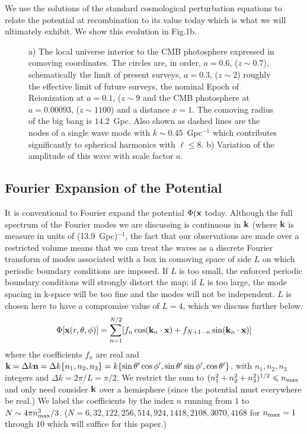 \documentclass[useAMS,usenatbib,a4paper]{mn2e}
\begin{document}
We use the solutions of the standard cosmological perturbation equations to relate the potential at recombination to its value today which is what we will ultimately exhibit. We show this evolution in Fig.1b.
\begin{figure}[t]
\centering
\caption{\small{a) The local universe interior to the CMB photosphere expressed in comoving coordinates. The circles are, in order, $a=0.6$, ($z\sim0.7$), schematically the limit of present surveys, $a=0.3$, ($z\sim2$) roughly the effective limit of future surveys, the nominal Epoch of Reionization at $a=0.1$, ($z\sim9$ and the CMB photosphere at $a=0.00093$, ($z\sim1100$) and a distance $x=1$. The comoving radius of the big bang is $14.2$~Gpc. Also shown as dashed lines are the nodes of a single wave mode with $k\sim0.45$~Gpc$^{-1}$ which contributes significantly to spherical harmonics with $\ell\leq8$. b) Variation of the amplitude of this wave with scale factor $a$.}}
\end{figure}
\subsection{Fourier Expansion of the Potential}
It is conventional to Fourier expand the potential $\Phi({\bf x}$ today. Although the full spectrum of the Fourier modes we are discussing is continuous in ${\bf k}$ (where $\bf k$ is measure in units of (13.9~Gpc)$^{-1}$, the fact that our observations are made over a restricted volume means that we can treat the waves as a discrete Fourier transform of modes associated with a box in comoving space of side $L$ on which periodic boundary conditions are imposed. If $L$ is too small, the enforced periodic boundary conditions will strongly distort the map; if $L$ is too large, the mode spacing in k-space will be too fine and the modes will not be independent. $L$ is chosen here to have a compromise value of $L=4$, which we discuss further below.
\begin{equation}
\Phi[{\bf x}(r,\theta,\phi)]=\sum_{n=1}^{N/2}[f_n\cos({\bf k}_n\cdot{\bf x})+f_{N+1-n}\sin({\bf k}_n\cdot{\bf x})]
\end{equation}
where the coefficients $f_n$ are real and ${\bf k}=\Delta k{\bf n}=\Delta k\{n_1,n_2,n_3\}=k\{\sin\theta'\cos\phi',\sin\theta'\sin\phi',\cos\theta'\}$, with $n_1,n_2,n_3$ integers and $\Delta k=2\pi/L=\pi/2$.  We restrict the sum to $(n_1^2+n_2^2+n_3^2)^{1/2}\le n_{\rm max}$ and only need consider $\bf k$ over a hemisphere (since the potential must everywhere be real.) We label the coefficients by the index $n$ running from $1$ to $N\sim4\pi n_{\rm max}^3/3$. ($N=6,32,122,256,514,924,1418,2108,3070,4168$ for $n_{\rm max}=1$ through $10$ which will suffice for this paper.)
\end{document}
